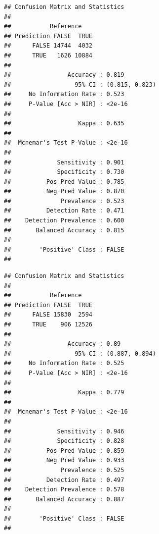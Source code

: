 \documentclass[
]{article}
\newenvironment{Shaded}{\begin{snugshade}}{\end{snugshade}}
\newcommand{\CommentTok}[1]{\textcolor[rgb]{0.56,0.35,0.01}{\textit{#1}}}
\newcommand{\FunctionTok}[1]{\textcolor[rgb]{0.00,0.00,0.00}{#1}}
\newcommand{\NormalTok}[1]{#1}
\newcommand{\SpecialCharTok}[1]{\textcolor[rgb]{0.00,0.00,0.00}{#1}}
\begin{document}
\begin{verbatim}
## Confusion Matrix and Statistics
## 
##           Reference
## Prediction FALSE  TRUE
##      FALSE 14744  4032
##      TRUE   1626 10884
##                                         
##                Accuracy : 0.819         
##                  95% CI : (0.815, 0.823)
##     No Information Rate : 0.523         
##     P-Value [Acc > NIR] : <2e-16        
##                                         
##                   Kappa : 0.635         
##                                         
##  Mcnemar's Test P-Value : <2e-16        
##                                         
##             Sensitivity : 0.901         
##             Specificity : 0.730         
##          Pos Pred Value : 0.785         
##          Neg Pred Value : 0.870         
##              Prevalence : 0.523         
##          Detection Rate : 0.471         
##    Detection Prevalence : 0.600         
##       Balanced Accuracy : 0.815         
##                                         
##        'Positive' Class : FALSE         
## 
\end{verbatim}

\begin{Shaded}
\end{Shaded}

\begin{verbatim}
## Confusion Matrix and Statistics
## 
##           Reference
## Prediction FALSE  TRUE
##      FALSE 15830  2594
##      TRUE    906 12526
##                                         
##                Accuracy : 0.89          
##                  95% CI : (0.887, 0.894)
##     No Information Rate : 0.525         
##     P-Value [Acc > NIR] : <2e-16        
##                                         
##                   Kappa : 0.779         
##                                         
##  Mcnemar's Test P-Value : <2e-16        
##                                         
##             Sensitivity : 0.946         
##             Specificity : 0.828         
##          Pos Pred Value : 0.859         
##          Neg Pred Value : 0.933         
##              Prevalence : 0.525         
##          Detection Rate : 0.497         
##    Detection Prevalence : 0.578         
##       Balanced Accuracy : 0.887         
##                                         
##        'Positive' Class : FALSE         
## 
\end{verbatim}
\end{document}
